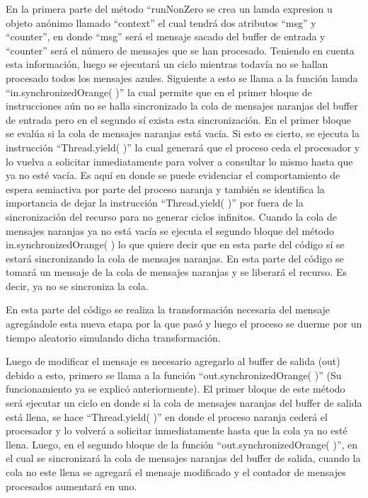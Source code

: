 \documentclass[a4paper]{article}
\begin{document}
        En la primera parte del método “runNonZero se crea un lamda expresion u objeto anónimo llamado “context” el cual tendrá dos atributos “msg” y “counter”, en donde “msg” será el mensaje sacado del buffer de entrada y “counter” será el número de mensajes que se han procesado. Teniendo en cuenta esta información, luego se ejecutará un ciclo mientras todavía no se hallan procesado todos los mensajes azules. Siguiente a esto se llama a la función lamda “in.synchronizedOrange( )” la cual permite que en el primer bloque de instrucciones aún no se halla sincronizado la cola de mensajes naranjas del buffer de entrada pero en el segundo sí exista esta sincronización. En el primer bloque se evalúa si la cola de mensajes naranjas está vacía. Si esto es cierto, se ejecuta la instrucción “Thread.yield( )” la cual generará que el proceso ceda el procesador y lo vuelva a solicitar inmediatamente para volver a consultar lo mismo hasta que ya no esté vacía. Es aquí en donde se puede evidenciar el comportamiento de espera semiactiva por parte del proceso naranja y también se identifica la importancia de dejar la instrucción “Thread.yield( )” por fuera de la sincronización del recurso para no generar ciclos infinitos. Cuando la cola de mensajes naranjas ya no está vacía se ejecuta el segundo bloque del método in.synchronizedOrange( ) lo que quiere decir que en esta parte del código sí se estará sincronizando la cola de mensajes naranjas. En esta parte del código se tomará un mensaje de la cola de mensajes naranjas y se liberará el recurso. Es decir, ya no se sincroniza la cola. 

        En esta parte del código se realiza la transformación necesaria del mensaje agregándole esta nueva etapa por la que pasó y luego el proceso se duerme por un tiempo aleatorio simulando dicha transformación. 

        Luego de modificar el mensaje es necesario agregarlo al buffer de salida (out) debido a esto, primero se llama a la función “out.synchronizedOrange( )” (Su funcionamiento ya se explicó anteriormente). El primer bloque de este método será  ejecutar un ciclo en donde si la cola de mensajes naranjas del buffer de salida está llena, se hace “Thread.yield( )” en donde el proceso naranja cederá el procesador y lo volverá a solicitar inmediatamente hasta que la cola ya no esté llena. Luego, en el segundo bloque de la función “out.synchronizedOrange( )”, en el cual se sincronizará la cola de mensajes naranjas del buffer de salida, cuando la cola no este llena se agregará el mensaje modificado y el contador de mensajes procesados aumentará en uno.  
\end{document}
